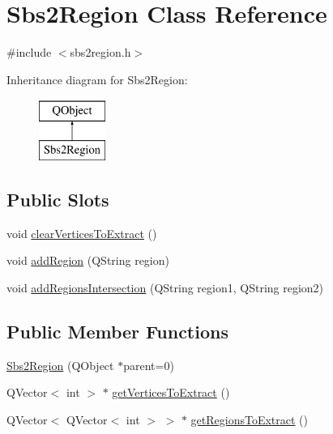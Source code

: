 \hypertarget{classSbs2Region}{\section{Sbs2\-Region Class Reference}
\label{classSbs2Region}
}


{\ttfamily \#include $<$sbs2region.\-h$>$}

Inheritance diagram for Sbs2\-Region\-:\begin{figure}[H]
\begin{center}
\leavevmode
\includegraphics[height=2.000000cm]{classSbs2Region}
\end{center}
\end{figure}
\subsection*{Public Slots}
\begin{DoxyCompactItemize}
\item 
void \hyperlink{classSbs2Region_a2df365b69377caf571e693ee3f9d6c36}{clear\-Vertices\-To\-Extract} ()
\item 
void \hyperlink{classSbs2Region_a3767a2e0a62a59c399bd1b7a34d6b441}{add\-Region} (Q\-String region)
\item 
void \hyperlink{classSbs2Region_a41c5fc2f9ec94546bab50f026babb2ca}{add\-Regions\-Intersection} (Q\-String region1, Q\-String region2)
\end{DoxyCompactItemize}
\subsection*{Public Member Functions}
\begin{DoxyCompactItemize}
\item 
\hyperlink{classSbs2Region_a35c6902e7679c89dc21f73d38a43c17c}{Sbs2\-Region} (Q\-Object $\ast$parent=0)
\item 
Q\-Vector$<$ int $>$ $\ast$ \hyperlink{classSbs2Region_a0531f672554084e4e395fe505ccc9c76}{get\-Vertices\-To\-Extract} ()
\item 
Q\-Vector$<$ Q\-Vector$<$ int $>$ $>$ $\ast$ \hyperlink{classSbs2Region_a0afbdc01b6c101390ca36f7d7cd60833}{get\-Regions\-To\-Extract} ()
\end{DoxyCompactItemize}


